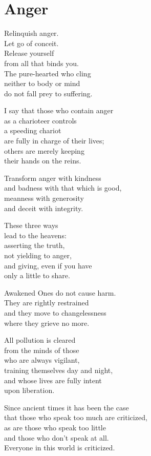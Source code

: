 
\chapter{Anger}


Relinquish anger.\\
Let go of conceit.\\
Release yourself\\
from all that binds you.\\
The pure-hearted who cling\\
neither to body or mind\\
do not fall prey to suffering.


I say that those who contain anger\\
as a charioteer controls\\
a speeding chariot\\
are fully in charge of their lives;\\
others are merely keeping\\
their hands on the reins.


Transform anger with kindness\\
and badness with that which is good,\\
meanness with generosity\\
and deceit with integrity.


These three ways\\
lead to the heavens:\\
asserting the truth,\\
not yielding to anger,\\
and giving, even if you have\\
only a little to share.


Awakened Ones do not cause harm.\\
They are rightly restrained\\
and they move to changelessness\\
where they grieve no more.


All pollution is cleared\\
from the minds of those\\
who are always vigilant,\\
training themselves day and night,\\
and whose lives are fully intent\\
upon liberation.


Since ancient times it has been the case\\
that those who speak too much are criticized,\\
as are those who speak too little\\
and those who don't speak at all.\\
Everyone in this world is criticized.


